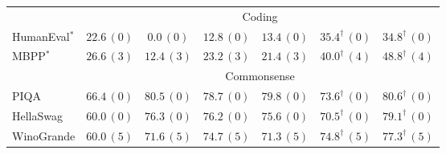 \begin{tabular}{l cccc|cc}
\midrule
 & \multicolumn{6}{c}{Coding} \\
\cmidrule(lr){2-7}
HumanEval$^{*}$ & $\mathbf{22.6}\,(0)$ & $0.0\,(0)$  & $12.8\,(0)$ & $13.4\,(0)$ & $35.4^{\dagger}\,(0)$ & $34.8^{\dagger}\,(0)$ \\
MBPP$^{*}$      & $\mathbf{26.6}\,(3)$ & $12.4\,(3)$ & $23.2\,(3)$ & $21.4\,(3)$ & $40.0^{\dagger}\,(4)$ & $48.8^{\dagger}\,(4)$ \\
\midrule
 & \multicolumn{6}{c}{Commonsense} \\
\cmidrule(lr){2-7}
PIQA       & $66.4\,(0)$ & $\mathbf{80.5}\,(0)$ & $78.7\,(0)$ & $79.8\,(0)$ & $73.6^{\dagger}\,(0)$ & $80.6^{\dagger}\,(0)$ \\
HellaSwag  & $60.0\,(0)$ & $\mathbf{76.3}\,(0)$ & $76.2\,(0)$ & $75.6\,(0)$ & $70.5^{\dagger}\,(0)$ & $79.1^{\dagger}\,(0)$ \\
WinoGrande & $60.0\,(5)$ & $71.6\,(5)$ & $\mathbf{74.7}\,(5)$ & $71.3\,(5)$ & $74.8^{\dagger}\,(5)$ & $77.3^{\dagger}\,(5)$ \\
\bottomrule
\end{tabular}
